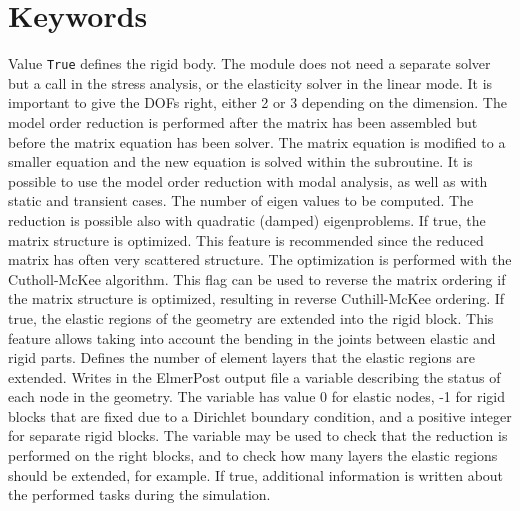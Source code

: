 \section{Keywords}

\sifbegin
{}
\sifbegin
Value {\tt True} defines the rigid body.
\sifend
{}
The module does not need a separate solver but
a call in the stress analysis,
or the elasticity solver in the linear mode. 
\sifbegin
{}
It is important to give the DOFs right, either 2 or 3 depending on
the dimension.
The model order reduction is performed after the matrix has been assembled
but before the matrix equation has been solver. The matrix equation is 
modified to a smaller equation and the new equation is solved within the subroutine.
It is possible to use the model order reduction with modal analysis, as
well as with static and transient cases.
The number of eigen values to be computed.
The reduction is possible also with quadratic (damped) eigenproblems.
If true, the matrix structure is optimized. This feature is recommended 
since the reduced matrix has often very scattered structure. The
optimization is performed with the Cutholl-McKee algorithm.
This flag can be used to reverse the matrix ordering if the matrix
structure is optimized, resulting in reverse Cuthill-McKee ordering.
If true, the elastic regions of the geometry are extended into the rigid 
block. This feature allows taking into account the bending in the joints 
between elastic and rigid parts.
Defines the number of element layers that the elastic regions are extended.
Writes in the ElmerPost output file a variable describing the status of 
each node in the geometry. The variable has value 0 for elastic nodes,
-1 for rigid blocks that are fixed due to a Dirichlet boundary condition,
and a positive integer for separate rigid blocks. The variable may be 
used to check that the reduction is performed on the right blocks, and to
check how many layers the elastic regions should be extended, for example.
If true, additional information is written about the performed tasks
during the simulation. 
\sifend
\sifend


